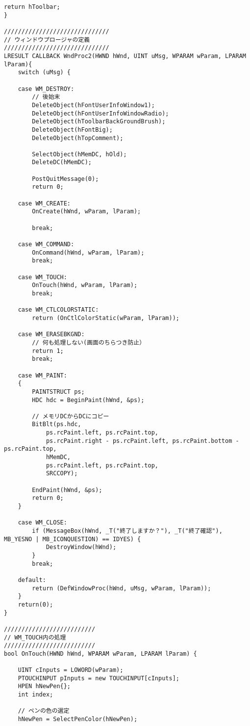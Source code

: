 \begin{lstlisting}[caption=UserInfoWindow.cpp]
	return hToolbar;
}

//////////////////////////////
// ウィンドウプロージャの定義
//////////////////////////////
LRESULT CALLBACK WndProc2(HWND hWnd, UINT uMsg, WPARAM wParam, LPARAM lParam){
	switch (uMsg) {
		
	case WM_DESTROY:
		// 後始末
		DeleteObject(hFontUserInfoWindow1);
		DeleteObject(hFontUserInfoWindowRadio);
		DeleteObject(hToolbarBackGroundBrush);
		DeleteObject(hFontBig);
		DeleteObject(hTopComment);

		SelectObject(hMemDC, hOld);
		DeleteDC(hMemDC);

		PostQuitMessage(0);
		return 0;

	case WM_CREATE:
		OnCreate(hWnd, wParam, lParam);

		break;
	
	case WM_COMMAND:
		OnCommand(hWnd, wParam, lParam);
		break;

	case WM_TOUCH:
		OnTouch(hWnd, wParam, lParam);
		break;

	case WM_CTLCOLORSTATIC:
		return (OnCtlColorStatic(wParam, lParam));

	case WM_ERASEBKGND:
		// 何も処理しない(画面のちらつき防止）
		return 1;
		break;

	case WM_PAINT:
	{
		PAINTSTRUCT ps;
		HDC hdc = BeginPaint(hWnd, &ps);

		// メモリDCからDCにコピー
		BitBlt(ps.hdc,
			ps.rcPaint.left, ps.rcPaint.top,
			ps.rcPaint.right - ps.rcPaint.left, ps.rcPaint.bottom - ps.rcPaint.top,
			hMemDC,
			ps.rcPaint.left, ps.rcPaint.top,
			SRCCOPY);

		EndPaint(hWnd, &ps);
		return 0;
	}

	case WM_CLOSE:
		if (MessageBox(hWnd, _T("終了しますか？"), _T("終了確認"), MB_YESNO | MB_ICONQUESTION) == IDYES) {
			DestroyWindow(hWnd);
		}
		break;

	default:
		return (DefWindowProc(hWnd, uMsg, wParam, lParam));
	}
	return(0);
}

//////////////////////////
// WM_TOUCH内の処理
//////////////////////////
bool OnTouch(HWND hWnd, WPARAM wParam, LPARAM lParam) {

	UINT cInputs = LOWORD(wParam);
	PTOUCHINPUT pInputs = new TOUCHINPUT[cInputs];
	HPEN hNewPen{};
	int index;

	// ペンの色の選定
	hNewPen = SelectPenColor(hNewPen);


\end{lstlisting}
